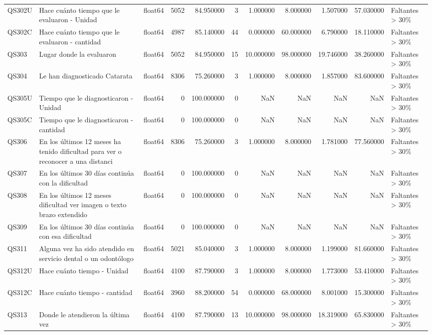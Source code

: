 \begin{longtable}{lllrrrrrrrl}
QS302U & Hace cuánto tiempo que le evaluaron - Unidad & float64 & 5052 & 84.950000 & 3 & 1.000000 & 8.000000 & 1.507000 & 57.030000 & Faltantes > 30\% \\
QS302C & Hace cuánto tiempo que le evaluaron - cantidad & float64 & 4987 & 85.140000 & 44 & 0.000000 & 60.000000 & 6.790000 & 18.110000 & Faltantes > 30\% \\
QS303 & Lugar donde la evaluaron & float64 & 5052 & 84.950000 & 15 & 10.000000 & 98.000000 & 19.746000 & 38.260000 & Faltantes > 30\% \\
QS304 & Le han diagnosticado Catarata & float64 & 8306 & 75.260000 & 3 & 1.000000 & 8.000000 & 1.857000 & 83.600000 & Faltantes > 30\% \\
QS305U & Tiempo que le diagnosticaron - Unidad & float64 & 0 & 100.000000 & 0 & NaN & NaN & NaN & NaN & Faltantes > 30\% \\
QS305C & Tiempo que le diagnosticaron - cantidad & float64 & 0 & 100.000000 & 0 & NaN & NaN & NaN & NaN & Faltantes > 30\% \\
QS306 & En los últimos 12 meses ha tenido dificultad para ver o reconocer a una distanci & float64 & 8306 & 75.260000 & 3 & 1.000000 & 8.000000 & 1.781000 & 77.560000 & Faltantes > 30\% \\
QS307 & En los últimos 30 días continúa con la dificultad & float64 & 0 & 100.000000 & 0 & NaN & NaN & NaN & NaN & Faltantes > 30\% \\
QS308 & En los últimos 12 meses dificultad ver imagen o texto brazo extendido & float64 & 0 & 100.000000 & 0 & NaN & NaN & NaN & NaN & Faltantes > 30\% \\
QS309 & En los últimos 30 días continúa con esa dificultad & float64 & 0 & 100.000000 & 0 & NaN & NaN & NaN & NaN & Faltantes > 30\% \\
QS311 & Alguna vez ha sido atendido en servicio dental o un odontólogo & float64 & 5021 & 85.040000 & 3 & 1.000000 & 8.000000 & 1.199000 & 81.660000 & Faltantes > 30\% \\
QS312U & Hace cuánto tiempo - Unidad & float64 & 4100 & 87.790000 & 3 & 1.000000 & 8.000000 & 1.773000 & 53.410000 & Faltantes > 30\% \\
QS312C & Hace cuánto tiempo - cantidad & float64 & 3960 & 88.200000 & 54 & 0.000000 & 68.000000 & 8.001000 & 15.300000 & Faltantes > 30\% \\
QS313 & Donde le atendieron la última vez & float64 & 4100 & 87.790000 & 13 & 10.000000 & 98.000000 & 18.319000 & 65.830000 & Faltantes > 30\% \\

\end{longtable}
